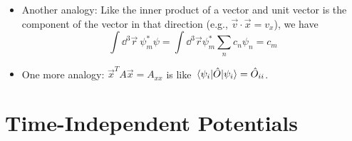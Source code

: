 \documentclass[../notes.tex]{subfiles}
\begin{document}
\begin{itemize}
\begin{itemize}
        \item Another analogy: Like the inner product of a vector and unit vector is the component of the vector in that direction (e.g., $\vec{v}\cdot\vec{x}=v_x$), we have
        \begin{equation*}
            \int\dd^3\vec{r}\ \psi_m^*\psi = \int\dd^3\vec{r}\psi_m^*\sum_nc_n\psi_n = c_m
        \end{equation*}
        \item One more analogy: $\vec{x}^TA\vec{x}=A_{xx}$ is like $\ev{\hat{O}}{\psi_i}=\hat{O}_{ii}$.
    \end{itemize}
\end{itemize}



\section{Time-Independent Potentials}
\end{document}
